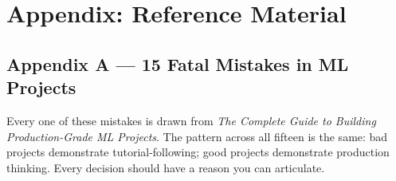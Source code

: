 \chapter{Appendix: Reference Material}
\label{ch:appendix}

\section{Appendix A --- 15 Fatal Mistakes in ML Projects}
\label{app:mistakes}

Every one of these mistakes is drawn from \emph{The Complete Guide to Building Production-Grade ML Projects}. The
pattern across all fifteen is the same: bad projects demonstrate tutorial-following; good projects demonstrate
production thinking. Every decision should have a reason you can articulate.

